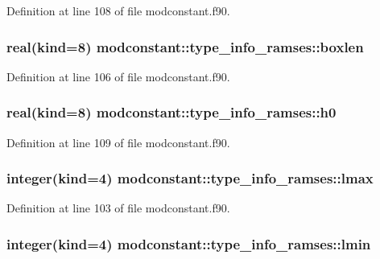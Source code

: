 Definition at line 108 of file modconstant.\-f90.

\hypertarget{structmodconstant_1_1type__info__ramses_ae0e48e2f8d3ecbb0f6f2b4a75a0bed46}{
\subsubsection[{boxlen}]{\setlength{\rightskip}{0pt plus 5cm}real(kind=8) modconstant\-::type\-\_\-info\-\_\-ramses\-::boxlen}}\label{structmodconstant_1_1type__info__ramses_ae0e48e2f8d3ecbb0f6f2b4a75a0bed46}


Definition at line 106 of file modconstant.\-f90.

\hypertarget{structmodconstant_1_1type__info__ramses_a6ef180334ca74ac1ed2aaf84938ed4a7}{
\subsubsection[{h0}]{\setlength{\rightskip}{0pt plus 5cm}real(kind=8) modconstant\-::type\-\_\-info\-\_\-ramses\-::h0}}\label{structmodconstant_1_1type__info__ramses_a6ef180334ca74ac1ed2aaf84938ed4a7}


Definition at line 109 of file modconstant.\-f90.

\hypertarget{structmodconstant_1_1type__info__ramses_a380293f72c7f9e4d25dd6dc31435a012}{
\subsubsection[{lmax}]{\setlength{\rightskip}{0pt plus 5cm}integer(kind=4) modconstant\-::type\-\_\-info\-\_\-ramses\-::lmax}}\label{structmodconstant_1_1type__info__ramses_a380293f72c7f9e4d25dd6dc31435a012}


Definition at line 103 of file modconstant.\-f90.

\hypertarget{structmodconstant_1_1type__info__ramses_aa30239d0b6e8821249fcf079837a5f39}{
\subsubsection[{lmin}]{\setlength{\rightskip}{0pt plus 5cm}integer(kind=4) modconstant\-::type\-\_\-info\-\_\-ramses\-::lmin}}\label{structmodconstant_1_1type__info__ramses_aa30239d0b6e8821249fcf079837a5f39}


